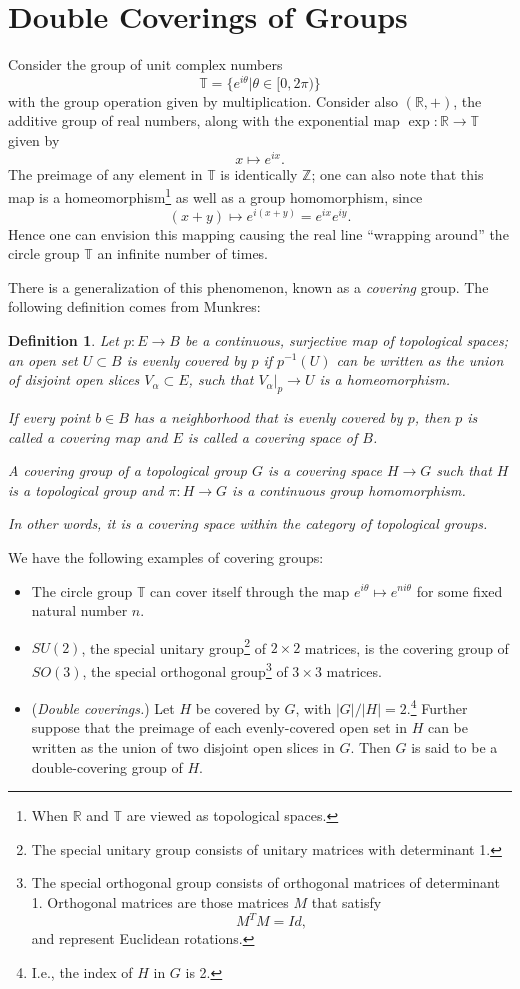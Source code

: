 \documentclass{tufte-handout}
\newtheorem{defn}{Definition} %
\begin{document}
\section{Double Coverings of Groups}
Consider the group of unit complex numbers
$$
\mathbb{T} = \{e^{i\theta} | \theta \in [0,2\pi) \}
$$
with the group operation given by multiplication. Consider also $(\mathbb{R},+)$, the additive group of real numbers, along with the exponential map $\exp : \mathbb{R} \to \mathbb{T}$ given by
$$
x \mapsto e^{ix}.
$$
The preimage of any element in $\mathbb{T}$ is identically $\mathbb{Z}$; one can also note that this map is a homeomorphism\footnote{When $\mathbb{R}$ and $\mathbb{T}$ are viewed as topological spaces.} as well as a group homomorphism, since
$$
(x + y) \mapsto e^{i(x+y)} = e^{ix}e^{iy}.
$$
Hence one can envision this mapping causing the real line ``wrapping around'' the circle group $\mathbb{T}$ an infinite number of times.

There is a generalization of this phenomenon, known as a \emph{covering} group. The following definition comes from Munkres:
\begin{fullwidth}
\begin{defn}
Let $p: E \to B$ be a continuous, surjective map of topological spaces; an open set $U \subset B$ is \emph{evenly covered} by $p$ if $p^{-1}(U)$ can be written as the union of disjoint open slices $V_\alpha \subset E$, such that $V_\alpha|_p \to U$ is a homeomorphism.

If every point $b \in B$ has a neighborhood that is evenly covered by $p$, then $p$ is called a \emph{covering map} and $E$ is called a \emph{covering space} of $B$.

A \emph{covering group} of a topological group $G$ is a covering space $H \to G$ such that $H$ is a topological group and $\pi: H \to G$ is a continuous group homomorphism.

In other words, it is a covering space within the category of topological groups.
\end{defn}
\end{fullwidth}
We have the following examples of covering groups:
\begin{itemize}
\item The circle group $\mathbb{T}$ can cover itself through the map $e^{i\theta} \mapsto e^{ni\theta}$ for some fixed natural number $n$.
\item $SU(2)$, the special unitary group\footnote{The special unitary group consists of unitary matrices with determinant 1.} of $2 \times 2$ matrices, is the covering group of $SO(3)$, the special orthogonal group\footnote{The special orthogonal group consists of orthogonal matrices of determinant 1. Orthogonal matrices are those matrices $M$ that satisfy
$$
M^{T}M = Id,
$$
and represent Euclidean rotations.} of $3 \times 3$ matrices.
\item (\emph{Double coverings.}) Let $H$ be covered by $G$, with $|G|/|H| = 2$.\footnote{I.e., the index of $H$ in $G$ is 2.} Further suppose that the preimage of each evenly-covered open set in $H$ can be written as the union of two disjoint open slices in $G$. Then $G$ is said to be a double-covering group of $H$.
\end{itemize}
\end{document}
